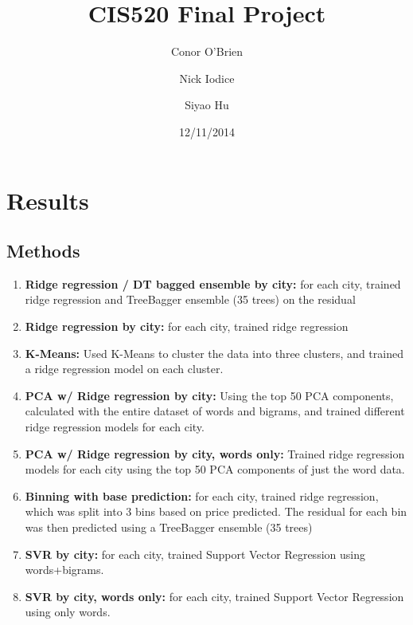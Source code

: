 \documentclass[11pt]{article}
\title{CIS520 Final Project}
\author{Conor O'Brien \and Nick Iodice \and Siyao Hu}
\date{12/11/2014}
\begin{document}
\maketitle

\section{Results}

\subsection*{Methods}
\begin{enumerate}
	\item \textbf{Ridge regression / DT bagged ensemble by city:} for each city, trained ridge regression and TreeBagger ensemble (35 trees) on the residual
	\item \textbf{Ridge regression by city:} for each city, trained ridge regression
	\item \textbf{K-Means:} Used K-Means to cluster the data into three clusters, and trained a ridge regression model on each cluster. 
	\item \textbf{PCA w/ Ridge regression by city:} Using the top 50 PCA components, calculated with the entire dataset of words and bigrams, and trained different  ridge regression models for each city.
	\item \textbf{PCA w/ Ridge regression by city, words only:} Trained ridge regression models for each city using the top 50 PCA components of just the word data.
	\item \textbf{Binning with base prediction:} for each city, trained ridge regression, which was split into 3 bins based on price predicted. The residual for each bin was then predicted using a TreeBagger ensemble (35 trees)
	\item \textbf{SVR by city:} for each city, trained Support Vector Regression using words+bigrams.
	\item \textbf{SVR by city, words only:} for each city, trained Support Vector Regression using only words.
\end{enumerate}
\end{document}
